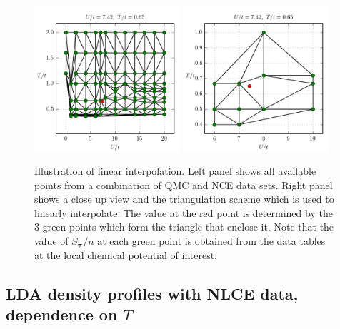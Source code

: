 \documentclass[11pt,letter]{article}
\newcommand{\bv}[1]{\ensuremath{\bm{#1}}}
\begin{document}
\begin{figure}
    \centering
\includegraphics[width=0.48\textwidth]{../dataplots/interp/allpts.png}
\includegraphics[width=0.48\textwidth]{../dataplots/interp/closepts.png}
\caption{ Illustration of linear interpolation.  Left panel shows all available
points from a combination of QMC and NCE data sets. Right panel shows a close
up view and the triangulation scheme which is used to linearly interpolate.
The value at the red point is determined by the 3 green points which form the
triangle that enclose it.  Note that the value of $S_{\bv{\pi}}/n$ at each
green point is obtained from the data tables at the local chemical potential of
interest.   } 
\label{fig:interp}
\end{figure}

\subsection{ LDA density profiles with NLCE data, dependence on $T$}
\end{document}
